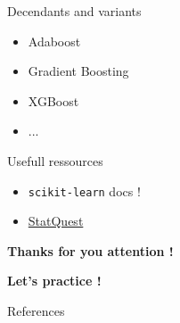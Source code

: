 \documentclass{irdbeamer}
\begin{document}
\begin{frame}{Decendants and variants}
    \begin{itemize}
        \item Adaboost
        \item Gradient Boosting
        \item XGBoost
        \item ...
    \end{itemize}
\end{frame}

\begin{frame}{Usefull ressources}
\begin{itemize}
    \item \texttt{scikit-learn} docs !
    \item \href{https://www.youtube.com/@statquest}{StatQuest}
\end{itemize}
\end{frame}

\begin{frame}[plain]
    \Huge{\textbf{Thanks for you attention !}}
    
    \vfill
    
    \LARGE{\textbf{Let's practice !}}
\end{frame}

\appendix
\begin{frame}[allowframebreaks]{References}
    {\footnotesize \printbibliography[heading=none]}
\end{frame}
\end{document}
